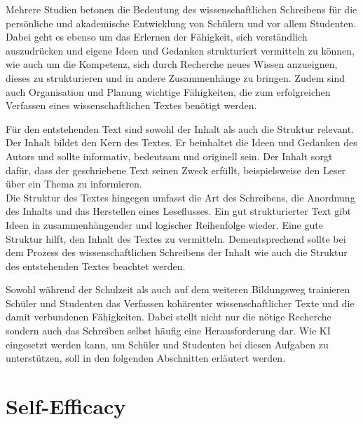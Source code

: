 \documentclass[../main.tex]{subfiles}
\begin{document}
Mehrere Studien betonen die Bedeutung des wissenschaftlichen Schreibens für die persönliche und akademische Entwicklung 
von Schülern und vor allem Studenten\cite{influencingUsingAi,ZukunftWissenschaftlichesPublizieren}. Dabei geht es ebenso um das Erlernen der Fähigkeit, sich verständlich auszudrücken und 
eigene Ideen und Gedanken strukturiert vermitteln zu können, wie auch um die Kompetenz, sich durch Recherche neues Wissen 
anzueignen, dieses zu strukturieren und in andere Zusammenhänge zu bringen. Zudem sind auch Organisation und Planung 
wichtige Fähigkeiten, die zum erfolgreichen Verfassen eines wissenschaftlichen Textes benötigt werden.\cite{SelfEfficacyBeliefs} 

Für den entstehenden Text sind sowohl der Inhalt als auch die Struktur relevant. Der Inhalt bildet den Kern des Textes. Er beinhaltet die Ideen und Gedanken des Autors und sollte 
informativ, bedeutsam und originell sein. Der Inhalt sorgt dafür, dass der geschriebene Text seinen Zweck erfüllt, beispielsweise 
den Leser über ein Thema zu informieren. \\
Die Struktur des Textes hingegen umfasst die Art des Schreibens, die Anordnung des Inhalts und das Herstellen eines Leseflusses. 
Ein gut strukturierter Text gibt Ideen in zusammenhängender und logischer Reihenfolge wieder. Eine gute Struktur hilft, den Inhalt des
Textes zu vermitteln. Dementsprechend sollte bei dem Prozess des wissenschaftlichen Schreibens der Inhalt wie auch die Struktur des entstehenden 
Textes beachtet werden.\cite{teachers}

Sowohl während der Schulzeit als auch auf dem weiteren Bildungsweg trainieren Schüler und Studenten das Verfassen kohärenter 
wissenschaftlicher Texte und die damit verbundenen Fähigkeiten. Dabei stellt nicht nur die nötige Recherche sondern auch das Schreiben selbst
häufig eine Herausforderung dar. Wie KI eingesetzt werden kann, um Schüler und Studenten bei diesen Aufgaben zu 
unterstützen, soll in den folgenden Abschnitten erläutert werden. 

\section{Self-Efficacy}
\end{document}
